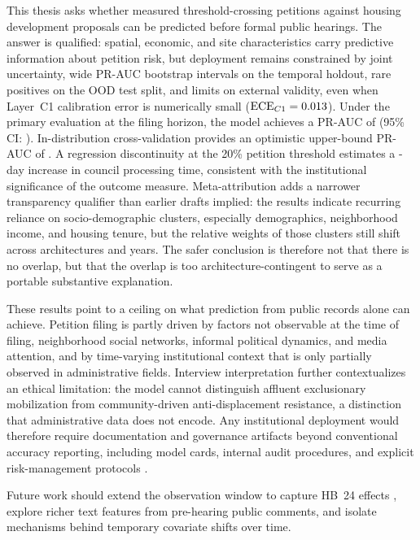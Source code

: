 \documentclass[11pt, letterpaper]{article}
\begin{document}
This thesis asks whether measured threshold-crossing petitions against housing development proposals can be predicted before formal public hearings. The answer is qualified: spatial, economic, and site characteristics carry predictive information about petition risk, but deployment remains constrained by joint uncertainty, wide PR-AUC bootstrap intervals on the temporal holdout, rare positives on the OOD test split, and limits on external validity, even when Layer~C1 calibration error is numerically small ($\text{ECE}_{C1}=0.013{}$). Under the primary evaluation at the filing horizon, the model achieves a PR-AUC of \metricBootstrapFiling{} (95\% CI: \metricBootstrapFilingCI{}). In-distribution cross-validation provides an optimistic upper-bound PR-AUC of \metricPRAUC{}. A regression discontinuity at the 20\% petition threshold estimates a \metricRDDelay{}-day increase in council processing time, consistent with the institutional significance of the outcome measure. Meta-attribution adds a narrower transparency qualifier than earlier drafts implied: the results indicate recurring reliance on socio-demographic clusters, especially demographics, neighborhood income, and housing tenure, but the relative weights of those clusters still shift across architectures and years. The safer conclusion is therefore not that there is no overlap, but that the overlap is too architecture-contingent to serve as a portable substantive explanation.

These results point to a ceiling on what prediction from public records alone can achieve. Petition filing is partly driven by factors not observable at the time of filing, neighborhood social networks, informal political dynamics, and media attention, and by time-varying institutional context that is only partially observed in administrative fields. Interview interpretation further contextualizes an ethical limitation: the model cannot distinguish affluent exclusionary mobilization from community-driven anti-displacement resistance, a distinction that administrative data does not encode. Any institutional deployment would therefore require documentation and governance artifacts beyond conventional accuracy reporting, including model cards, internal audit procedures, and explicit risk-management protocols \cite{mitchell2019modelcards,raji2020smactr,nist2023airm}.

Future work should extend the observation window to capture HB~24 effects \cite{hb24_2025}, explore richer text features from pre-hearing public comments, and isolate mechanisms behind temporary covariate shifts over time.
\end{document}
